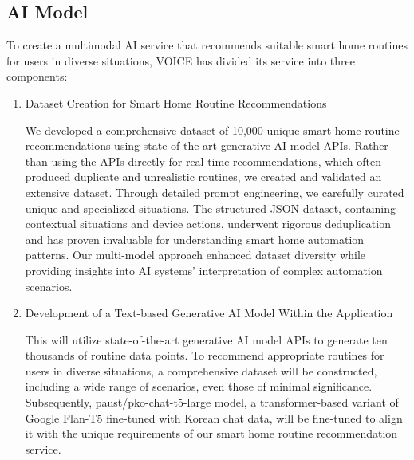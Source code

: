 \documentclass[conference]{IEEEtran}
\begin{document}
\vspace{0.7em} %

\subsection{AI Model}
To create a multimodal AI service that recommends suitable smart home routines for users in diverse situations, VOICE has divided its service into three components:
\vspace{0.5em}

\begin{enumerate}[label=\arabic*]
    \item Dataset Creation for Smart Home Routine Recommendations\par
    \vspace{0.3em}
    We developed a comprehensive dataset of 10,000 unique smart home routine recommendations using state-of-the-art generative AI model APIs. Rather than using the APIs directly for real-time recommendations, which often produced duplicate and unrealistic routines, we created and validated an extensive dataset. Through detailed prompt engineering, we carefully curated unique and specialized situations. The structured JSON dataset, containing contextual situations and device actions, underwent rigorous deduplication and has proven invaluable for understanding smart home automation patterns. Our multi-model approach enhanced dataset diversity while providing insights into AI systems' interpretation of complex automation scenarios.

    \vspace{1em}
    
    \item Development of a Text-based Generative AI Model Within the Application\par
    \vspace{0.3em}
    This will utilize state-of-the-art generative AI model APIs to generate ten thousands of routine data points. To recommend appropriate routines for users in diverse situations, a comprehensive dataset will be constructed, including a wide range of scenarios, even those of minimal significance. Subsequently, paust/pko-chat-t5-large model, a transformer-based variant of Google Flan-T5 fine-tuned with Korean chat data, will be fine-tuned to align it with the unique requirements of our smart home routine recommendation service. 

    \vspace{1em}


\end{enumerate}
\end{document}

